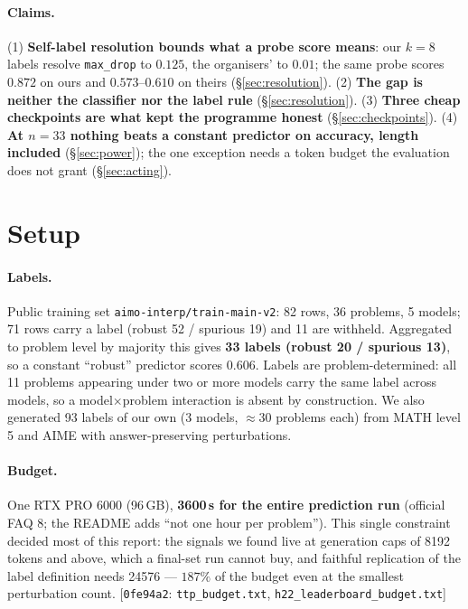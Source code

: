 \documentclass[10pt]{article}
\newcommand{\cmt}[2]{{\footnotesize\textsf{[}\texttt{#1}\textsf{:} #2\textsf{]}}}
\begin{document}
\paragraph{Claims.} (1) \textbf{Self-label resolution bounds what a probe score means}: our
$k{=}8$ labels resolve \texttt{max\_drop} to $0.125$, the organisers' to $0.01$; the same probe
scores $0.872$ on ours and $0.573$--$0.610$ on theirs (\S\ref{sec:resolution}). (2) \textbf{The gap
is neither the classifier nor the label rule} (\S\ref{sec:resolution}). (3) \textbf{Three cheap
checkpoints are what kept the programme honest} (\S\ref{sec:checkpoints}). (4) \textbf{At $n{=}33$
nothing beats a constant predictor on accuracy, length included} (\S\ref{sec:power}); the one
exception needs a token budget the evaluation does not grant (\S\ref{sec:acting}).

\section{Setup}
\label{sec:setup}
\paragraph{Labels.} Public training set \texttt{aimo-interp/train-main-v2}: 82 rows, 36 problems,
5 models; 71 rows carry a label (robust 52 / spurious 19) and 11 are withheld. Aggregated to problem
level by majority this gives \textbf{33 labels (robust 20 / spurious 13)}, so a constant ``robust''
predictor scores $0.606$. Labels are problem-determined: all 11 problems appearing under two or more
models carry the same label across models, so a model$\times$problem interaction is absent by
construction. We also generated 93 labels of our own (3 models, $\approx 30$ problems each) from
MATH level 5 and AIME with answer-preserving perturbations.

\paragraph{Budget.} One RTX PRO 6000 (96\,GB), \textbf{3600\,s for the entire prediction run}
(official FAQ 8; the README adds ``not one hour per problem''). This single constraint decided most
of this report: the signals we found live at generation caps of 8192 tokens and above, which a
final-set run cannot buy, and faithful replication of the label definition needs 24576 --- $187\%$
of the budget even at the smallest perturbation count.
\cmt{0fe94a2}{\texttt{ttp\_budget.txt}, \texttt{h22\_leaderboard\_budget.txt}}
\end{document}
